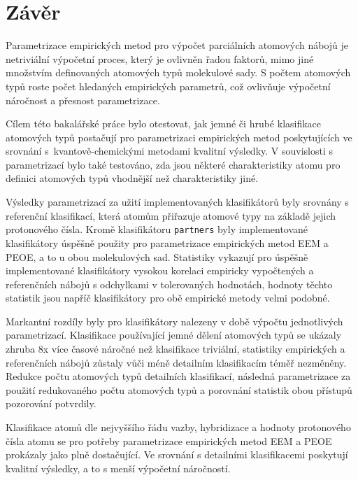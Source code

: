 \chapter{Závěr}
Parametrizace empirických metod pro výpočet parciálních atomových nábojů je netriviální výpočetní proces, který je ovlivněn řadou faktorů, mimo jiné množstvím definovaných atomových typů molekulové sady. S počtem atomových typů roste počet hledaných empirických parametrů, což ovlivňuje výpočetní náročnost a přesnost parametrizace.

Cílem této bakalářské práce bylo otestovat, jak jemné či hrubé klasifikace atomových typů postačují pro parametrizaci empirických metod poskytujících ve srovnání s~kvantově-chemickými metodami kvalitní výsledky. V souvislosti s parametrizací bylo také testováno, zda jsou některé charakteristiky atomu pro definici atomových typů vhodnější než charakteristiky jiné.


Výsledky parametrizací za užití implementovaných klasifikátorů byly srovnány s referenční klasifikací, která atomům přiřazuje atomové typy na základě jejich protonového čísla. Kromě klasifikátoru \verb|partners| byly implementované klasifikátory úspěšně použity pro parametrizace empirických metod EEM a PEOE, a to u obou molekulových sad. Statistiky  vykazují pro úspěšně implementované klasifikátory vysokou korelaci empiricky vypočtených a referenčních nábojů s odchylkami v tolerovaných hodnotách, hodnoty těchto statistik jsou napříč klasifikátory pro obě empirické metody velmi podobné. 

Markantní rozdíly byly pro klasifikátory nalezeny v době výpočtu jednotlivých parametrizací. Klasifikace používající jemné dělení atomových typů se ukázaly zhruba 8x více časové náročné než klasifikace triviální, statistiky empirických a referenčních nábojů zůstaly vůči méně detailním klasifikacím téměř nezměněny. Redukce počtu atomových typů detailních klasifikací, následná parametrizace za použití redukovaného počtu atomových typů a porovnání statistik obou přístupů pozorování potvrdily.
 
Klasifikace atomů dle nejvyššího řádu vazby, hybridizace a hodnoty protonového čísla atomu se pro potřeby parametrizace empirických metod EEM a PEOE prokázaly jako plně dostačující. Ve srovnání s detailními klasifikacemi poskytují kvalitní výsledky, a to s menší výpočetní náročností.







